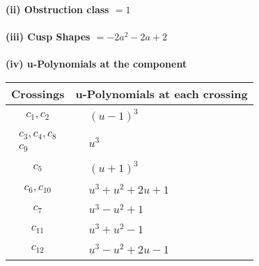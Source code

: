 \documentclass[1p]{elsarticle_modified}
\theoremstyle{definition}
\begin{document}
\flushleft \textbf{(ii) Obstruction class $= 1$}\\~\\
\flushleft \textbf{(iii) Cusp Shapes $= -2 a^2-2 a+2$}\\~\\
\newpage\renewcommand{\arraystretch}{1}
\flushleft \textbf{(iv) u-Polynomials at the component}\newline \\
\begin{tabular}{m{50pt}|m{274pt}}
Crossings & \hspace{64pt}u-Polynomials at each crossing \\
\hline $$\begin{aligned}c_{1},c_{2}\end{aligned}$$&$\begin{aligned}
&(u-1)^3
\end{aligned}$\\
\hline $$\begin{aligned}c_{3},c_{4},c_{8}\\c_{9}\end{aligned}$$&$\begin{aligned}
&u^3
\end{aligned}$\\
\hline $$\begin{aligned}c_{5}\end{aligned}$$&$\begin{aligned}
&(u+1)^3
\end{aligned}$\\
\hline $$\begin{aligned}c_{6},c_{10}\end{aligned}$$&$\begin{aligned}
&u^3+u^2+2 u+1
\end{aligned}$\\
\hline $$\begin{aligned}c_{7}\end{aligned}$$&$\begin{aligned}
&u^3- u^2+1
\end{aligned}$\\
\hline $$\begin{aligned}c_{11}\end{aligned}$$&$\begin{aligned}
&u^3+u^2-1
\end{aligned}$\\
\hline $$\begin{aligned}c_{12}\end{aligned}$$&$\begin{aligned}
&u^3- u^2+2 u-1
\end{aligned}$\\
\hline
\end{tabular}\\~\\
\end{document}
